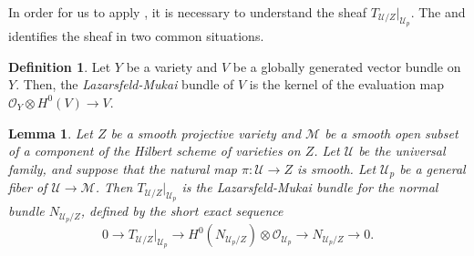 \documentclass[11pt,reqno]{amsart}
\theoremstyle{plain}
\newtheorem{lemma}[theorem]{Lemma}
\theoremstyle{definition}
\newtheorem{definition}[theorem]{Definition}
\theoremstyle{remark}
\numberwithin{equation}{section}
\newcommand{\cO}{{\mathscr O}}
\renewcommand{\to}{{\longrightarrow}}
\numberwithin{equation}{section}
\newcommand{\OO}{\mathscr{O}}
\newcommand{\cM}{\mathcal{M}}
\newcommand{\cU}{\mathcal{U}}
\begin{document}
In order for us to apply , it is necessary to understand the sheaf $T_{\cU/Z}|_{\cU_{p}}$.  The  and  identifies the sheaf in two common situations.

\begin{definition}
Let $Y$ be a variety and $V$ be a globally generated vector bundle on $Y$. Then, the \emph{Lazarsfeld-Mukai} bundle of $V$ is the kernel of the evaluation map $\OO_Y\otimes H^0(V)\to V$.
\end{definition}

\begin{lemma}
\label{lem-LazMuk}
Let $Z$ be a smooth projective variety and $\cM$ be a smooth open subset of a component of the Hilbert scheme of varieties on $Z$. Let $\cU$ be the universal family, and suppose that the natural map $\pi: \cU \to Z$ is smooth. Let $\cU_{p}$ be a general fiber of $\cU \to \cM$. Then $T_{\cU/Z}|_{\cU_{p}}$ is the Lazarsfeld-Mukai bundle for the normal bundle $N_{\cU_{p}/Z}$, defined by the short exact sequence
\[ 0 \to T_{\cU / Z}|_{\cU_{p}} \to H^0(N_{\cU_{p}/Z}) \otimes \cO_{\cU_{p}} \to N_{\cU_{p}/Z} \to 0. \]
\end{lemma}
\end{document}
